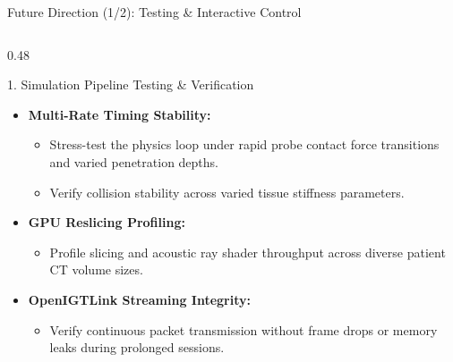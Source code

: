 \documentclass[aspectratio=169, 10pt]{beamer}
\begin{document}
\begin{frame}{Future Direction (1/2): Testing \& Interactive Control}
    \begin{columns}[T]
        \begin{column}{0.48\textwidth}
            \begin{block}{1. Simulation Pipeline Testing \& Verification}
                \begin{itemize}\itemsep=3pt
                    \item \textbf{Multi-Rate Timing Stability:}
                    \begin{itemize}\itemsep=1pt
                        \item Stress-test the physics loop under rapid probe contact force transitions and varied penetration depths.
                        \item Verify collision stability across varied tissue stiffness parameters.
                    \end{itemize}
                    \item \textbf{GPU Reslicing Profiling:}
                    \begin{itemize}\itemsep=1pt
                        \item Profile slicing and acoustic ray shader throughput across diverse patient CT volume sizes.
                    \end{itemize}
                    \item \textbf{OpenIGTLink Streaming Integrity:}
                    \begin{itemize}\itemsep=1pt
                        \item Verify continuous packet transmission without frame drops or memory leaks during prolonged sessions.
                    \end{itemize}
                \end{itemize}
            \end{block}
        \end{column}


\end{columns}
\end{frame}
\end{document}
